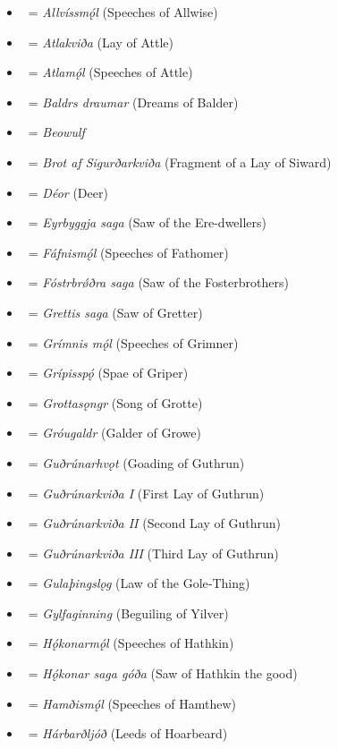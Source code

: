 \begin{itemize}%
	\item \Allvismal\ = \emph{Allvíssmǫ́l} (Speeches of Allwise)
	\item \Atlakvida\ = \emph{Atlakviða} (Lay of Attle)
	\item \Atlamal\ = \emph{Atlamǫ́l} (Speeches of Attle)
	\item \Baldrsdraumar\ = \emph{Baldrs draumar} (Dreams of Balder)
	\item \Beowulf\ = \emph{Beowulf}
	\item \Brot\ = \emph{Brot af Sigurðarkviða} (Fragment of a Lay of Siward)
	\item \Deor\ = \emph{Déor} (Deer)
	\item \EyrbyggjaSaga\ = \emph{Eyrbyggja saga} (Saw of the Ere-dwellers)
	\item \Fafnismal\ = \emph{Fáfnismǫ́l} (Speeches of Fathomer)
	\item \FostrbroedhraSaga\ = \emph{Fóstrbrǿðra saga} (Saw of the Fosterbrothers)
	\item \Grettissaga\ = \emph{Grettis saga} (Saw of Gretter)
	\item \Grimnismal\ = \emph{Grímnis mǫ́l} (Speeches of Grimner)
	\item \Gripisspa\ = \emph{Grípisspǫ́} (Spae of Griper)
	\item \Grottasongr\ = \emph{Grottasǫngr} (Song of Grotte)
	\item \Grougaldr\ = \emph{Gróugaldr} (Galder of Growe)
	\item \Gudrunarhvot\ = \emph{Guðrúnarhvǫt} (Goading of Guthrun)
	\item \GudrunOne\ = \emph{Guðrúnarkviða I} (First Lay of Guthrun)
	\item \GudrunTwo\ = \emph{Guðrúnarkviða II} (Second Lay of Guthrun)
	\item \GudrunThree\ = \emph{Guðrúnarkviða III} (Third Lay of Guthrun)
	\item \Gulatingslog\ = \emph{Gulaþingslǫg} (Law of the Gole‑Thing)
	\item \Gylfaginning\ = \emph{Gylfaginning} (Beguiling of Yilver)
	\item \Hakonarmal\ = \emph{Hǫ́konarmǫ́l} (Speeches of Hathkin)
	\item \HakonarSaga\ = \emph{Hǫ́konar saga góða} (Saw of Hathkin the good)
	\item \Hamdismal\ = \emph{Hamðismǫ́l} (Speeches of Hamthew)
	\item \Harbardsljod\ = \emph{Hárbarðljóð} (Leeds of Hoarbeard)

\end{itemize}
